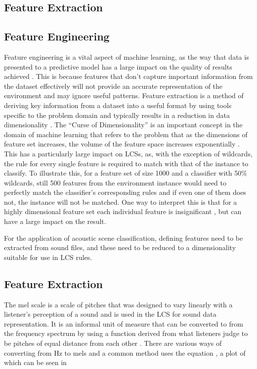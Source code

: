 \documentclass[11pt]{article}
\begin{document}
\begin{multicols}{2}
\section{Feature Extraction}
\label{sec:feat}

\subsection{Feature Engineering}

Feature engineering is a vital aspect of machine learning, as the way that data is presented to a predictive model has a large impact on the quality of results achieved \cite{Brownlee2014}. This is because features that don’t capture important information from the dataset effectively will not provide an accurate representation of the environment and may ignore useful patterns. Feature extraction is a method of deriving key information from a dataset into a useful format by using tools specific to the problem domain and typically results in a reduction in data dimensionality \cite{Howbert2012}. The “Curse of Dimensionality” is an important concept in the domain of machine learning that refers to the problem that as the dimensions of feature set increases, the volume of the feature space increases exponentially \cite{Keogh2010}. This has a particularly large impact on LCSs, as, with the exception of wildcards, the rule for every single feature is required to match with that of the instance to classify. To illustrate this, for a feature set of size 1000 and a classifier with 50\% wildcards, still 500 features from the environment instance would need to perfectly match the classifier’s corresponding rules and if even one of them does not, the instance will not be matched. One way to interpret this is that for a highly dimensional feature set each individual feature is insignificant \cite{Keogh2010}, but can have a large impact on the result.

For the application of acoustic scene classification, defining features need to be extracted from sound files, and these need to be reduced to a dimensionality suitable for use in LCS rules.

\subsection{Feature Extraction}

The mel scale is a scale of pitches that was designed to vary linearly with a listener’s perception of a sound and is used in the LCS for sound data representation. It is an informal unit of measure that can be converted to from the frequency spectrum by using a function derived from what listeners judge to be pitches of equal distance from each other \cite{Luening1975}. There are various ways of converting from Hz to mels and a common method uses the equation  \cite{OShaughnessy1987}, a plot of which can be seen in 


\end{multicols}
\end{document}
